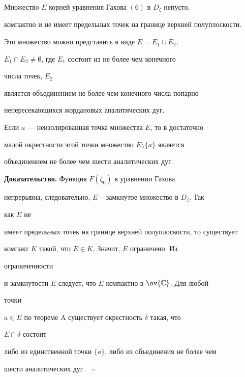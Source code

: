 \begin{thmnonum} 


Множество $E$ корней уравнения Гахова $(6)$ в $D_\zeta$ непусто, 


компактно и не имеет предельных точек на границе верхней полуплоскости. 


Это множество можно представить в виде $E=E_1\cup E_2$, 


$E_1\cap E_2\ne\emptyset$, где $E_1$ состоит из не более чем конечного 


числа точек, $E_2$ 


является объединением не более чем конечного числа попарно 


непересекающихся жордановых аналитических дуг. 


 


Если $a$ --- неизолированная точка множества $E$, то в достаточно 


малой окрестности этой точки множество $E\setminus\{a\}$ является 


объединением не более чем шести аналитических дуг. 


\end{thmnonum} 


 


{\bf Доказательство.} Функция $F(\zeta_0)$ в уравнении Гахова 


непрерывна, следовательно, $E$ -- замкнутое множество в $D_\zeta$. Так 


как $E$ не 


имеет предельных точек на границе верхней полуплоскости, то существует 


компакт $K$ такой, что $E\in K$. Значит, $E$ ограничено. Из 


ограниченности 


и замкнутости $E$ следует, что $E$ компактно в $\ov{\Bbb C}$. Для любой 


точки 


$a\in E$ по теореме A существует окрестность $\delta$ такая, что 


$E\cap\delta$ состоит 


либо из единственной точки $\{a\}$, либо из объединения не более чем 


шести аналитических дуг.$\quad\square$


 


 


